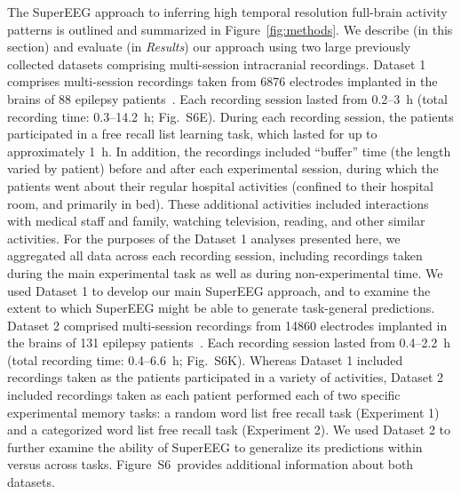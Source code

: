 \documentclass[11pt]{article}
\newcommand{\suppstats}{S6}
\begin{document}
The SuperEEG approach to inferring high temporal resolution full-brain activity
patterns is outlined and summarized in Figure~\ref{fig:methods}. We describe (in
this section) and evaluate (in \textit{Results}) our approach using two large
previously collected datasets comprising multi-session intracranial recordings.
Dataset 1 comprises multi-session recordings taken from 6876 electrodes
implanted in the brains of 88 epilepsy patients~\citep{SedeEtal03, SedeEtal07a,
SedeEtal07b, MannEtal11, MannEtal12}.  Each recording session lasted from
0.2--3~h (total recording time: 0.3--14.2~h; Fig.~\suppstats E).  During each
recording session, the patients participated in a free recall list learning
task, which lasted for up to approximately 1~h.  In addition, the recordings
included ``buffer'' time (the length varied by patient) before and after each
experimental session, during which the patients went about their regular
hospital activities (confined to their hospital room, and primarily in bed).
These additional activities included interactions with medical staff and family,
watching television, reading, and other similar activities.  For the purposes of
the Dataset 1 analyses presented here, we aggregated all data across each
recording session, including recordings taken during the main experimental task
as well as during non-experimental time.  We used Dataset 1 to develop our main
SuperEEG approach, and to examine the extent to which SuperEEG might be able to
generate task-general predictions.  Dataset 2 comprised multi-session recordings
from 14860 electrodes implanted in the brains of 131 epilepsy
patients~\citep{EzzyEtal17, HoraEtal17, KragEtal17, KuceEtal17, LinEtal17,
SoloEtal18, WeidEtal18, EzzyEtal18, KuceEtal18}.  Each recording session lasted
from 0.4--2.2~h (total recording time: 0.4--6.6~h; Fig.~\suppstats K).  Whereas
Dataset 1 included recordings taken as the patients participated in a variety of
activities, Dataset 2 included recordings taken as each patient performed each
of two specific experimental memory tasks: a random word list free recall task
(Experiment 1) and a categorized word list free recall task (Experiment 2).  We
used Dataset 2 to further examine the ability of SuperEEG to generalize its
predictions within versus across tasks.  Figure~\suppstats~provides additional
information about both datasets.
\end{document}
